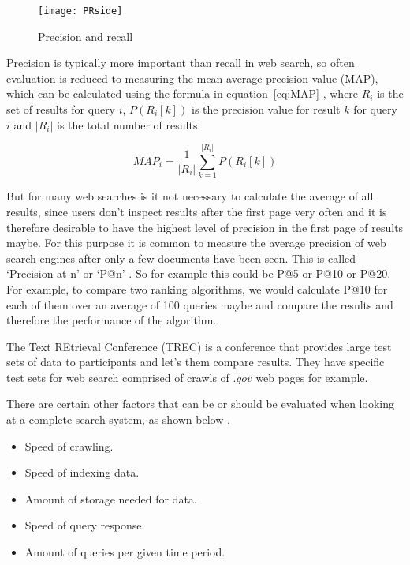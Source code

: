 \begin{figure}[!htbp]
  \centering
  \texttt{[image: PRside]}
  \caption[Precision and recall]{Precision and recall \autocite{Wikimedia2014}}
\label{fig:PR}
\end{figure}

Precision is typically more important than recall in web search, so often evaluation is reduced to measuring the mean average precision value (MAP), which can be calculated using the formula in equation~\ref{eq:MAP}\sidepar{$\bm{\Sigma}$~\ref{eq:MAP}} \autocite[p.141]{Baeza-Yates2011}, where $R_i$ is the set of results for query $i$, $P(R_i[k])$ is the precision value for result $k$ for query $i$ and $|R_i|$ is the total number of results.

\begin{equation}
  MAP_i = \frac{1}{|R_i|} \sum_{k=1}^{|R_i|} P(R_i[k])
\label{eq:MAP}
\end{equation}

But for many web searches is it not necessary to calculate the average of all results, since users don't inspect results after the first page very often and it is therefore desirable to have the highest level of precision in the first page of results maybe. For this purpose it is common to measure the average precision of web search engines after only a few documents have been seen. This is called `Precision at n' or `P@n' \autocite{Baeza-Yates2011}. So for example this could be P@5 or P@10 or P@20. For example, to compare two ranking algorithms, we would calculate P@10 for each of them over an average of \num{100} queries maybe and compare the results and therefore the performance of the algorithm.

The Text REtrieval Conference (TREC) \autocite{Nist2016} is a conference that provides large test sets of data \autocite{Trec2011} to participants and let's them compare results. They have specific test sets for web search comprised of crawls of $.gov$ web pages for example.

There are certain other factors that can be or should be evaluated when looking at a complete search system, as shown below \autocite{Baeza-Yates2011}. 

\begin{itemize}
  \item Speed of crawling.
  \item Speed of indexing data.
  \item Amount of storage needed for data.
  \item Speed of query response.
  \item Amount of queries per given time period.
\end{itemize}

